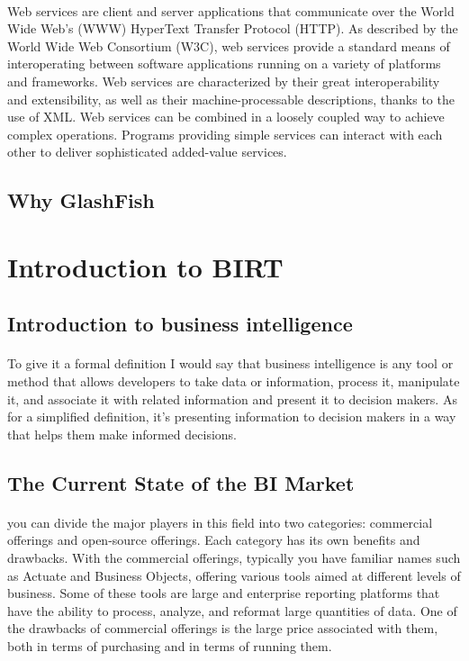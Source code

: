 \documentclass[12pt,a4paper]{report}
\begin{document}
\paragraph{}
Web services are client and server applications that communicate over the World Wide Web’s (WWW) HyperText Transfer Protocol (HTTP). As described by the World Wide Web Consortium (W3C), web services provide a standard means of interoperating between software applications running on a variety of platforms and frameworks. Web services are characterized by their great interoperability and extensibility, as well as their machine-processable descriptions, thanks to the use of XML. Web services can be combined in a loosely coupled way to achieve complex operations. Programs providing simple services can interact with each other to deliver sophisticated added-value services.

\subsection{Why GlashFish}



\section{Introduction to BIRT}
\subsection{Introduction to business intelligence}

\paragraph{}
To give it a formal definition I would say that business intelligence is any tool or method 
that allows developers to take data or information, process it, manipulate it, and associate 
it with related information and present it to decision makers. As for a simplified definition, 
it's presenting information to decision makers in a way that helps them make informed decisions.

\subsection{The Current State of the BI Market}
\paragraph{}
you can divide the major players in this field into two categories: commercial offerings 
and open-source offerings. Each category has its own benefits and drawbacks. With the 
commercial offerings, typically you have familiar names such as Actuate and Business Objects,
offering various tools aimed at different levels of business. Some of these tools
are large and enterprise reporting platforms that have the ability to process,
analyze, and reformat large quantities of data. One of the drawbacks of commercial offerings is 
the large price associated with them, both in terms of purchasing and in terms of running them. 
\end{document}
